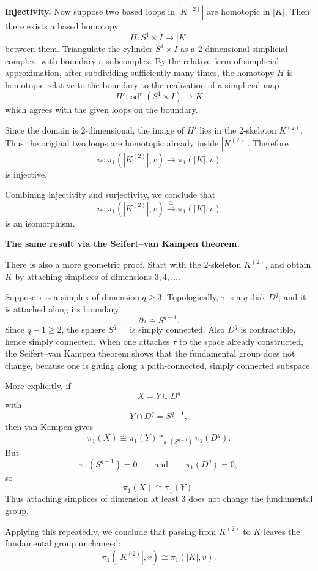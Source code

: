 \documentclass[12pt,a4paper]{article}
\theoremstyle{notespace}
\begin{document}
\medskip

\textbf{Injectivity.}
Now suppose two based loops in \(|K^{(2)}|\) are homotopic in \(|K|\). Then there exists a based homotopy
\[
H:S^1\times I \to |K|
\]
between them. Triangulate the cylinder \(S^1\times I\) as a \(2\)-dimensional simplicial complex, with boundary a subcomplex. By the relative form of simplicial approximation, after subdividing sufficiently many times, the homotopy \(H\) is homotopic relative to the boundary to the realization of a simplicial map
\[
H':\operatorname{sd}^r(S^1\times I)\to K
\]
which agrees with the given loops on the boundary.

Since the domain is \(2\)-dimensional, the image of \(H'\) lies in the \(2\)-skeleton \(K^{(2)}\). Thus the original two loops are homotopic already inside \(|K^{(2)}|\). Therefore
\[
i_*:\pi_1(|K^{(2)}|,v)\to \pi_1(|K|,v)
\]
is injective.

Combining injectivity and surjectivity, we conclude that
\[
i_*:\pi_1(|K^{(2)}|,v)\xrightarrow{\cong}\pi_1(|K|,v)
\]
is an isomorphism.

\medskip

\textbf{The same result via the Seifert--van Kampen theorem.}

There is also a more geometric proof. Start with the \(2\)-skeleton \(K^{(2)}\), and obtain \(K\) by attaching simplices of dimensions \(3,4,\dots\).

Suppose \(\tau\) is a simplex of dimension \(q\ge 3\). Topologically, \(\tau\) is a \(q\)-disk \(D^q\), and it is attached along its boundary
\[
\partial \tau \cong S^{q-1}.
\]
Since \(q-1\ge 2\), the sphere \(S^{q-1}\) is simply connected. Also \(D^q\) is contractible, hence simply connected. When one attaches \(\tau\) to the space already constructed, the Seifert--van Kampen theorem shows that the fundamental group does not change, because one is gluing along a path-connected, simply connected subspace.

More explicitly, if
\[
X = Y \cup D^q
\]
with
\[
Y\cap D^q = S^{q-1},
\]
then van Kampen gives
\[
\pi_1(X)\cong \pi_1(Y) *_{\pi_1(S^{q-1})} \pi_1(D^q).
\]
But
\[
\pi_1(S^{q-1})=0
\qquad\text{and}\qquad
\pi_1(D^q)=0,
\]
so
\[
\pi_1(X)\cong \pi_1(Y).
\]
Thus attaching simplices of dimension at least \(3\) does not change the fundamental group.

Applying this repeatedly, we conclude that passing from \(K^{(2)}\) to \(K\) leaves the fundamental group unchanged:
\[
\pi_1(|K^{(2)}|,v)\cong \pi_1(|K|,v).
\]
\end{document}
